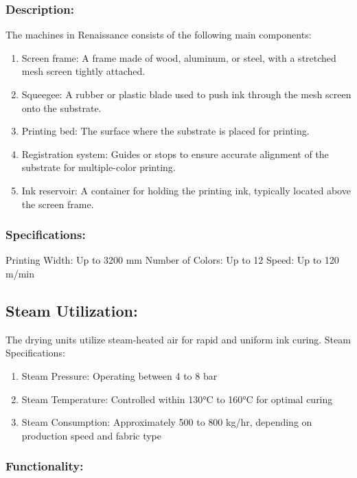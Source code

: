 \subsubsection{Description:}


The machines in Renaissance consists of the following main
components:


\begin{enumerate}
\item
  Screen frame: A frame made of wood, aluminum, or steel, with a
  stretched mesh screen tightly attached.
\item
  Squeegee: A rubber or plastic blade used to push ink through the mesh
  screen onto the substrate.
\item
  Printing bed: The surface where the substrate is placed for printing.
\item
  Registration system: Guides or stops to ensure accurate alignment of
  the substrate for multiple-color printing.
\item
  Ink reservoir: A container for holding the printing ink, typically
  located above the screen frame.
\end{enumerate}

\subsubsection{Specifications:}

Printing Width: Up to 3200 mm
Number of Colors: Up to 12
Speed: Up to 120 m/min

\subsection{Steam Utilization:}
The drying units utilize steam-heated air for rapid and uniform ink curing.
Steam Specifications:
\begin{enumerate}
  \item Steam Pressure: Operating between 4 to 8 bar
  \item Steam Temperature: Controlled within 130°C to 160°C for optimal curing
  \item Steam Consumption: Approximately 500 to 800 kg/hr, depending on production speed and fabric type
\end{enumerate}


\subsubsection{Functionality:}

